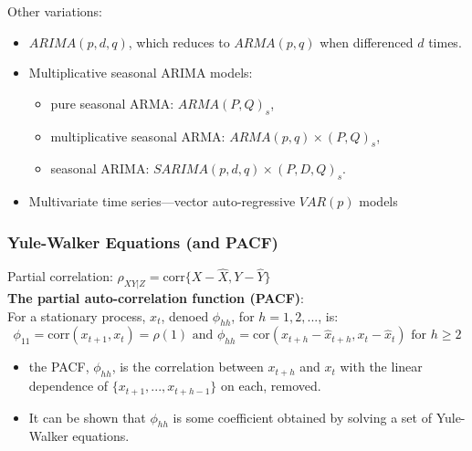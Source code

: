\documentclass[11pt]{article}
\newcommand{\noi}{\noindent}
\begin{document}
\noi Other variations:
\begin{itemize}
    \item $ARIMA(p, d, q)$, which reduces to $ARMA(p, q)$ when differenced $d$ times.
    \item Multiplicative seasonal ARIMA models:
        \begin{itemize}
            \item pure seasonal ARMA: $ARMA(P, Q)_s$,
            \item multiplicative seasonal ARMA: $ARMA(p,q) \times (P,Q)_s$,
            \item seasonal ARIMA: $SARIMA(p, d, q) \times (P, D, Q)_s$.
        \end{itemize}
    \item Multivariate time series---vector auto-regressive $VAR(p)$ models 
\end{itemize}

\subsubsection{Yule-Walker Equations (and PACF)}
\noi Partial correlation: $ \rho_{XY|Z} = \text{corr}\{X - \hat X, Y - \hat Y\}$ \\

\noi \textbf{The partial auto-correlation function (PACF)}: \\
\noi For a stationary process, $x_t$, denoed $\phi_{hh}$, for $h=1,2,...$, is:
$$\phi_{11} = \text{corr}(x_{t+1}, x_t) = \rho(1) \text{ and } \phi_{hh} = \text{cor}(x_{t+h} - \hat{x}_{t+h}, x_t - \hat{x}_t) \text{ for } h \geq 2$$
\begin{itemize}
    \item the PACF, $\phi_{hh}$, is the correlation between $x_{t+h}$ and $x_t$ with the linear dependence of $\{x_{t+1},...,x_{t+h-1}\}$ on each, removed.
    \item It can be shown that $\phi_{hh}$ is some coefficient obtained by solving a set of Yule-Walker equations.
\end{itemize} \phantom{i}
\end{document}
